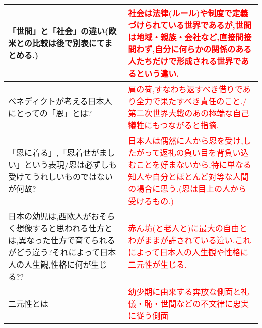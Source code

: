 \documentclass[a4paper,10pt]{article}
\begin{document}
\begin{longtable}{|p{}|p{}|}
    「世間」と「社会」の違い(欧米との比較は後で別表にてまとめる.) & \textcolor{red}{社会は法律(ルール)や制度で定義づけられている世界であるが,世間は地域・親族・会社など,直接間接問わず,自分に何らかの関係のある人たちだけで形成される世界であるという違い.} \\ \hline
    ベネディクトが考える日本人にとっての「恩」とは? & \textcolor{red}{肩の荷,すなわち返すべき借りであり全力で果たすべき責任のこと./第二次世界大戦のあの極端な自己犠牲にもつながると指摘.} \\ \hline
    「恩に着る」,「恩着せがましい」という表現/恩は必ずしも受けてうれしいものではないが何故?& \textcolor{red}{日本人は偶然に人から恩を受け,したがって返礼の負い目を背負い込むことを好まないから.特に単なる知人や自分とほとんど対等な人間の場合に思う.(恩は目上の人から受けるもの.)} \\ \hline
    日本の幼児は,西欧人がおそらく想像すると思われる仕方とは,異なった仕方で育てられるがどう違う?それによって日本人の人生観,性格に何が生じる?? & \textcolor{red}{赤ん坊(と老人と)に最大の自由とわがままが許されている違い.これによって日本人の人生観や性格に二元性が生じる.} \\ \hline
    二元性とは & \textcolor{red}{幼少期に由来する奔放な側面と礼儀・恥・世間などの不文律に忠実に従う側面} \\ \hline
\end{longtable}
\end{document}
